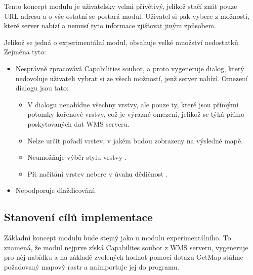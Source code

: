 \documentclass[a4paper,12pt]{article}
\begin{document}
Tento koncept modulu je uživatelsky velmi přívětivý, jelikož stačí znát pouze URL adresu a o vše ostatní se postará modul. Uživatel si pak vybere z možností, které server nabízí a nemusí tyto informace zjišťovat jiným způsobem. 


Jelikož se jedná o experimentální modul, obsahuje velké množství nedostatků. Zejména tyto:

\begin{itemize}
\item Nesprávně zpracovává Capabilities soubor, a proto vygeneruje dialog, který nedovoluje uživateli vybrat si ze všech možností, jenž server nabízí. Omezení dialogu jsou tato:
\begin{itemize}
 \item     V dialogu nenabídne všechny vrstvy, ale pouze ty, které jsou přímými potomky kořenové vrstvy, což je výrazné omezení, jelikož se týká přímo poskytovaných dat WMS serveru.
 \item 	   Nelze určit pořadí vrstev, v jakém budou  zobrazeny na výsledné mapě.
 \item 	   Neumožňuje výběr stylu vrstvy .
 \item 	   Při načítání vrstev nebere v úvahu dědičnost	  . 
\end{itemize}
\item Nepodporuje dlaždicování. 
\end{itemize}


 
\subsection{Stanovení cílů implementace}


Základní koncept modulu bude stejný jako u modulu experimentálního. To znamená, že modul nejprve získá Capabilites soubor z WMS serveru, vygeneruje pro něj nabídku a na základě zvolených hodnot pomocí 
dotazu GetMap stáhne požadovaný mapový rastr a naimportuje jej do programu. 
\end{document}
